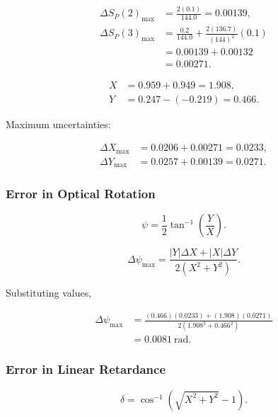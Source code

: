 \begin{equation}
    \begin{aligned}
    \Delta S_P(2)_{\max}
    &=\frac{2(0.1)}{144.0}
    =0.00139,\\[6pt]
    \Delta S_P(3)_{\max}
    &=
    \frac{0.2}{144.0}
    +
    \frac{2(136.7)}{(144)^2}(0.1) \\
    &=0.00139+0.00132 \\
    &=0.00271.
    \end{aligned}
\end{equation}

\begin{subequations}
    \begin{align}
    X &= 0.959+0.949=1.908,\\
    Y &= 0.247-(-0.219)=0.466.
    \end{align}
\end{subequations}

Maximum uncertainties:

\begin{subequations}
    \begin{align}
    \Delta X_{\max}
    &=0.0206+0.00271
    =0.0233,\\
    \Delta Y_{\max}
    &=0.0257+0.00139
    =0.0271.
    \end{align}
\end{subequations}

\subsubsection*{Error in Optical Rotation}
\[
\psi=\frac12\tan^{-1}\left(\frac{Y}{X}\right).
\]

\begin{equation}
\Delta\psi_{\max}
=
\frac{|Y|\Delta X+|X|\Delta Y}
{2(X^2+Y^2)}.
\end{equation}

Substituting values,

\begin{equation}
    \begin{aligned}
    \Delta\psi_{\max}
    &=
    \frac{(0.466)(0.0233)+(1.908)(0.0271)}
    {2(1.908^2+0.466^2)} \\
    &=0.0081~\text{rad}.
    \end{aligned}
\end{equation}
\subsubsection*{Error in Linear Retardance}
\[
\delta=\cos^{-1}\left(\sqrt{X^2+Y^2}-1\right).
\]

